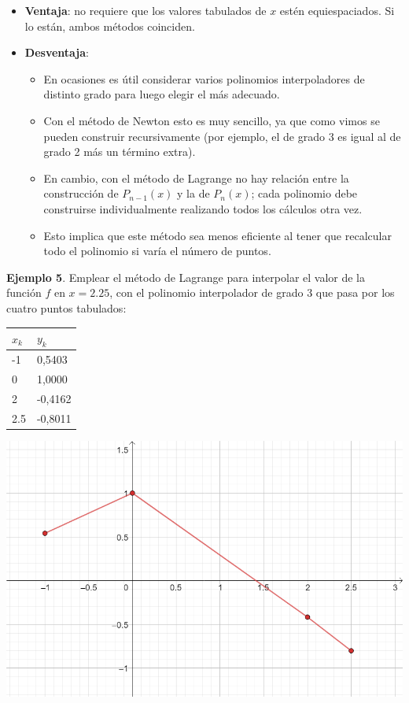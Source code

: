 \documentclass[openany]{book}
\providecommand{\tightlist}{%
  \setlength{\itemsep}{0pt}\setlength{\parskip}{0pt}}
\begin{document}
\begin{itemize}
\item
  \textbf{Ventaja}: no requiere que los valores tabulados de \(x\) estén equiespaciados. Si lo están, ambos métodos coinciden.
\item
  \textbf{Desventaja}:

  \begin{itemize}
  \tightlist
  \item
    En ocasiones es útil considerar varios polinomios interpoladores de distinto grado para luego elegir el más adecuado.
  \item
    Con el método de Newton esto es muy sencillo, ya que como vimos se pueden construir recursivamente (por ejemplo, el de grado 3 es igual al de grado 2 más un término extra).
  \item
    En cambio, con el método de Lagrange no hay relación entre la construcción de \(P_{n-1}(x)\) y la de \(P_n(x)\); cada polinomio debe construirse individualmente realizando todos los cálculos otra vez.
  \item
    Esto implica que este método sea menos eficiente al tener que recalcular todo el polinomio si varía el número de puntos.
  \end{itemize}
\end{itemize}

\textbf{Ejemplo 5}. Emplear el método de Lagrange para interpolar el valor de la función \(f\) en \(x=2.25\), con el polinomio interpolador de grado 3 que pasa por los cuatro puntos tabulados:

\begin{longtable}[]{@{}ll@{}}
\toprule
\(x_k\) & \(y_k\)\tabularnewline
\midrule
\endhead
-1 & 0,5403\tabularnewline
0 & 1,0000\tabularnewline
2 & -0,4162\tabularnewline
2.5 & -0,8011\tabularnewline
\bottomrule
\end{longtable}

\begin{center}\includegraphics[width=1\linewidth]{Plots/U4/lagrej1} \end{center}
\end{document}
